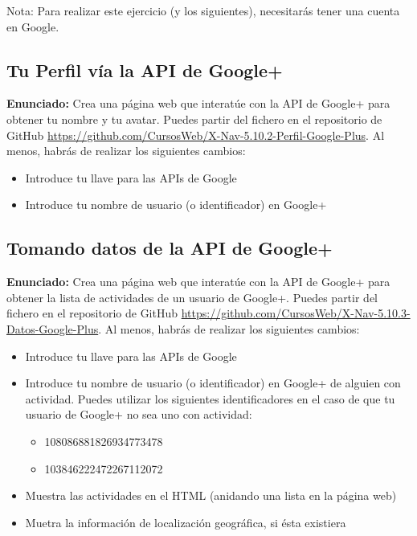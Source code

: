 Nota: Para realizar este ejercicio (y los siguientes), necesitarás tener
una cuenta en Google.

\subsection{Tu Perfil vía la API de Google+}
\label{subsec:tu-perfil-en-googleplus}

\textbf{Enunciado:} Crea una página web que interatúe con la API de Google+ para obtener tu nombre y tu avatar. Puedes partir del fichero en el repositorio de GitHub \url{https://github.com/CursosWeb/X-Nav-5.10.2-Perfil-Google-Plus}. Al menos, habrás de realizar los siguientes cambios:

\begin{itemize}
  \item Introduce tu llave para las APIs de Google
  \item Introduce tu nombre de usuario (o identificador) en Google+
\end{itemize}


\subsection{Tomando datos de la API de Google+}
\label{subsec:tomando-datos-googleplus}

\textbf{Enunciado:} Crea una página web que interatúe con la API de Google+ para obtener la lista de actividades de un usuario de Google+. Puedes partir del fichero en el repositorio de GitHub \url{https://github.com/CursosWeb/X-Nav-5.10.3-Datos-Google-Plus}. Al menos, habrás de realizar los siguientes cambios:

\begin{itemize}
  \item Introduce tu llave para las APIs de Google
  \item Introduce tu nombre de usuario (o identificador) en Google+ de alguien con actividad. Puedes utilizar los siguientes identificadores en el caso de que tu usuario de Google+ no sea uno con actividad:
  \begin{itemize}
    \item 108086881826934773478
    \item 103846222472267112072
  \end{itemize}
  \item Muestra las actividades en el HTML (anidando una lista en la página web)
  \item Muetra la información de localización geográfica, si ésta existiera
\end{itemize}


